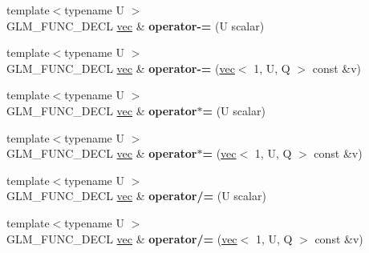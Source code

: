 \begin{DoxyCompactItemize}
{\footnotesize template$<$typename U $>$ }\\G\+L\+M\+\_\+\+F\+U\+N\+C\+\_\+\+D\+E\+CL \hyperlink{structglm_1_1vec}{vec} \& {\bfseries operator-\/=} (U scalar)
\item 
\mbox{\label{structglm_1_1vec_3_011_00_01T_00_01Q_01_4_afca22c18c34addd806151214edd57cc2}} 
{\footnotesize template$<$typename U $>$ }\\G\+L\+M\+\_\+\+F\+U\+N\+C\+\_\+\+D\+E\+CL \hyperlink{structglm_1_1vec}{vec} \& {\bfseries operator-\/=} (\hyperlink{structglm_1_1vec}{vec}$<$ 1, U, Q $>$ const \&v)
\item 
\mbox{\label{structglm_1_1vec_3_011_00_01T_00_01Q_01_4_ac3400fb8176cefe78c52da5a9188446c}} 
{\footnotesize template$<$typename U $>$ }\\G\+L\+M\+\_\+\+F\+U\+N\+C\+\_\+\+D\+E\+CL \hyperlink{structglm_1_1vec}{vec} \& {\bfseries operator$\ast$=} (U scalar)
\item 
\mbox{\label{structglm_1_1vec_3_011_00_01T_00_01Q_01_4_aa070c2898cf88a73e4f60581e77bce44}} 
{\footnotesize template$<$typename U $>$ }\\G\+L\+M\+\_\+\+F\+U\+N\+C\+\_\+\+D\+E\+CL \hyperlink{structglm_1_1vec}{vec} \& {\bfseries operator$\ast$=} (\hyperlink{structglm_1_1vec}{vec}$<$ 1, U, Q $>$ const \&v)
\item 
\mbox{\label{structglm_1_1vec_3_011_00_01T_00_01Q_01_4_a0b6b057cf632327a79e33dc759773855}} 
{\footnotesize template$<$typename U $>$ }\\G\+L\+M\+\_\+\+F\+U\+N\+C\+\_\+\+D\+E\+CL \hyperlink{structglm_1_1vec}{vec} \& {\bfseries operator/=} (U scalar)
\item 
\mbox{\label{structglm_1_1vec_3_011_00_01T_00_01Q_01_4_a9ecfce3e3f712d4735f00bb4250d0f76}} 
{\footnotesize template$<$typename U $>$ }\\G\+L\+M\+\_\+\+F\+U\+N\+C\+\_\+\+D\+E\+CL \hyperlink{structglm_1_1vec}{vec} \& {\bfseries operator/=} (\hyperlink{structglm_1_1vec}{vec}$<$ 1, U, Q $>$ const \&v)
\item 
\mbox{\label{structglm_1_1vec_3_011_00_01T_00_01Q_01_4_a987d92f70c9541002ae2b696f06947f0}} 

\end{DoxyCompactItemize}
